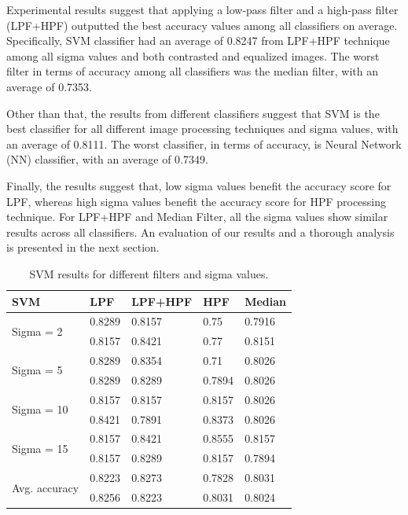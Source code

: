\documentclass[conference]{IEEEtran}
\begin{document}
Experimental results suggest that applying a low-pass filter and a high-pass filter (LPF+HPF) outputted the best accuracy values among all classifiers on average. Specifically, SVM classifier had an average of 0.8247 from LPF+HPF technique among all sigma values and both contrasted and equalized images. The worst filter in terms of accuracy among all classifiers was the median filter, with an average of 0.7353. 

Other than that, the results from different classifiers suggest that SVM is the best classifier for all different image processing techniques and sigma values, with an average of 0.8111. The worst classifier, in terms of accuracy, is Neural Network (NN) classifier, with an average of 0.7349. 

Finally, the results suggest that, low sigma values benefit the accuracy score for LPF, whereas high sigma values benefit the accuracy score for HPF processing technique. For LPF+HPF and Median Filter, all the sigma values show similar results across all classifiers. An evaluation of our results and a thorough analysis is presented in the next section. 

\begin{table}[h!]
\centering
\caption{SVM results for different filters and sigma values.}
\label{table:1}
\begin{tabular}{ |p{1.4cm}||p{1.1cm}|p{1.3cm}|p{1.1cm}|p{1cm}|  }
\hline
 SVM & LPF &LPF+HPF &HPF & Median\\
 \hline
 \multirow{2}{*}{Sigma = 2} &0.8289 &0.8157& 0.75&0.7916\\ 
 &0.8157	&0.8421&	0.77&0.8151\\
\hline
\multirow{2}{*}{Sigma = 5}  & 0.8289&	0.8354	&0.71	&0.8026\\
&  0.8289& 0.8289	& 0.7894	&0.8026\\
\hline
\multirow{2}{*}{Sigma = 10}  &	0.8157	&0.8157&	0.8157	&0.8026\\
&	0.8421	& 0.7891&0.8373	& 0.8026\\
\hline
\multirow{2}{*}{Sigma = 15} &	0.8157&	0.8421&	0.8555&	0.8157\\
& 0.8157&	 0.8289&	  0.8157&  0.7894\\
 \hline
 \multirow{2}{*}{Avg. accuracy} &0.8223 & 0.8273 & 0.7828 & 0.8031 \\
&0.8256 & 0.8223 & 0.8031 & 0.8024 \\
\hline
\end{tabular} \\
\end{table}
\end{document}
